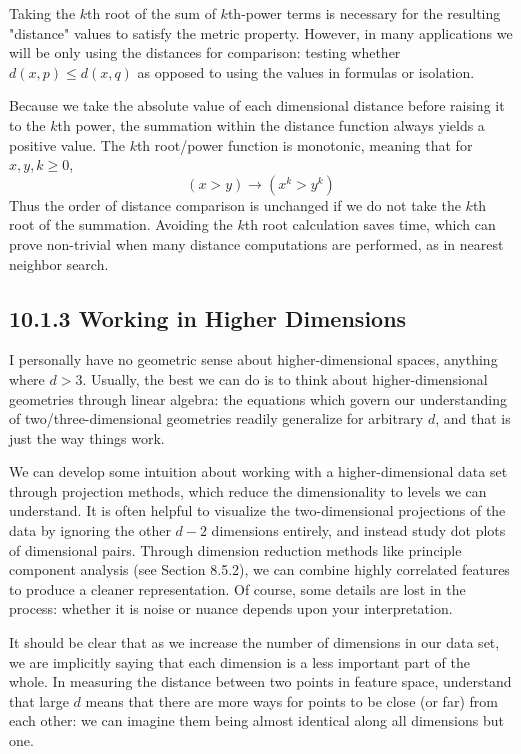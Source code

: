 \documentclass[10pt]{article}
\begin{document}
Taking the $k$th root of the sum of $k$th-power terms is necessary for the resulting "distance" values to satisfy the metric property. However, in many applications we will be only using the distances for comparison: testing whether $d(x, p) \leq d(x, q)$ as opposed to using the values in formulas or isolation.

Because we take the absolute value of each dimensional distance before raising it to the $k$th power, the summation within the distance function always yields a positive value. The $k$th root/power function is monotonic, meaning that for $x, y, k \geq 0$,
\[
(x>y) \rightarrow\left(x^{k}>y^{k}\right)
\]
Thus the order of distance comparison is unchanged if we do not take the $k$th root of the summation. Avoiding the $k$th root calculation saves time, which can prove non-trivial when many distance computations are performed, as in nearest neighbor search.

\subsection*{10.1.3 Working in Higher Dimensions}
I personally have no geometric sense about higher-dimensional spaces, anything where $d>3$. Usually, the best we can do is to think about higher-dimensional geometries through linear algebra: the equations which govern our understanding of two/three-dimensional geometries readily generalize for arbitrary $d$, and that is just the way things work.

We can develop some intuition about working with a higher-dimensional data set through projection methods, which reduce the dimensionality to levels we can understand. It is often helpful to visualize the two-dimensional projections of the data by ignoring the other $d-2$ dimensions entirely, and instead study dot plots of dimensional pairs. Through dimension reduction methods like principle component analysis (see Section 8.5.2), we can combine highly correlated features to produce a cleaner representation. Of course, some details are lost in the process: whether it is noise or nuance depends upon your interpretation.

It should be clear that as we increase the number of dimensions in our data set, we are implicitly saying that each dimension is a less important part of the whole. In measuring the distance between two points in feature space, understand that large $d$ means that there are more ways for points to be close (or far) from each other: we can imagine them being almost identical along all dimensions but one.
\end{document}
